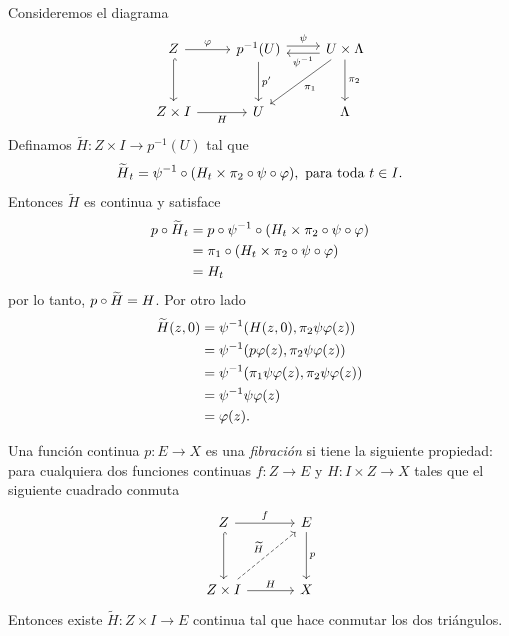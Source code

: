 \begin{dem}
    Consideremos el diagrama 
    \begin{equation*}
        \begin{tikzcd}[row sep=1cm]
            Z \arrow[r,"\varphi"]\arrow[d, hook]& p^{-1}(U)\arrow[r, shift left=0.6ex, "\psi"]
      \arrow[r, <-, shift right=0.6ex, "\psi^{-1}"']\arrow[d,"p'"] & U\times \Lambda\arrow[dl,"\pi_1"]\arrow[d,"\pi_2"]\\
      Z\times I \arrow[r,"H"']& U & \Lambda
        \end{tikzcd}
    \end{equation*}
    Definamos $\widetilde{H}:Z\times I\to p^{-1}(U)$ tal que 
    \begin{equation*}
       \widetilde{\rule{0pt}{1.6ex}H}_t=\psi^{-1}\circ (H_t\times\pi_2\circ\psi\circ\varphi), \text{ para toda } t\in I.
    \end{equation*}
    Entonces $\widetilde{H}$ es continua y satisface
    \begin{align*}
        p\circ\widetilde{\rule{0pt}{1.6ex}H}_t&=p\circ\psi^{-1}\circ (H_t\times\pi_2\circ\psi\circ\varphi)\\
        &=\pi_1\circ  (H_t\times\pi_2\circ\psi\circ\varphi)\\
        &=H_t
    \end{align*}
    por lo tanto, $p\circ\widetilde{\rule{0pt}{1.6ex}H}=H$. Por otro lado 
    \begin{align*}
        \widetilde{\rule{0pt}{1.6ex}H}(z,0)&=\psi^{-1}(H(z,0),\pi_2\psi\varphi(z))\\
        &=\psi^{-1}(p\varphi(z),\pi_2\psi\varphi(z))\\
        &=\psi^{-1}(\pi_1\psi\varphi(z),\pi_2\psi\varphi(z))\\
        &=\psi^{-1}\psi\varphi(z)\\
        &=\varphi(z).
    \end{align*}
\end{dem}
\begin{definicion}
    Una función continua $p:E\to X$ es una \textit{fibración } si tiene la siguiente propiedad: para cualquiera dos funciones continuas $f:Z\to E$ y $H:I\times Z\to X$ tales que el siguiente cuadrado conmuta
    \begin{equation*}
        \begin{tikzcd}[row sep=1.2cm, column sep=1.2cm]
            Z \arrow[r,"f"] \arrow[hook,d] & E\arrow[d, "p"]\\
            Z\times I \arrow[ur, "\widetilde{H}", dashed]\arrow[r, "H"] & X
        \end{tikzcd}
    \end{equation*}
    Entonces existe $\widetilde{H}:Z\times I\to E$ continua tal que hace conmutar los dos triángulos. 
\end{definicion}
